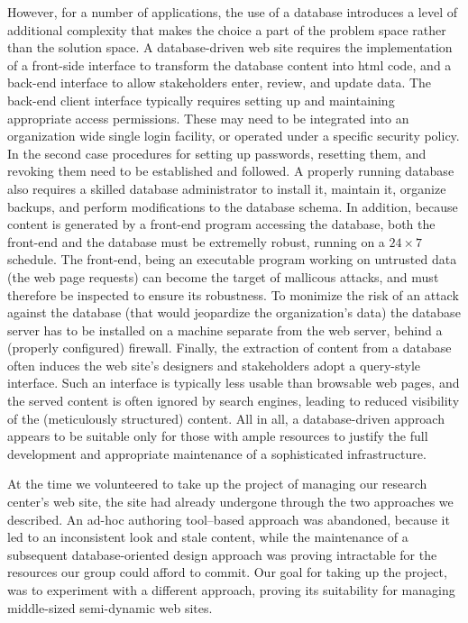 \documentclass[10pt]{article}
\begin{document}
However, for a number of applications, the use of a database
introduces a level of additional complexity that
makes the choice a part of
the problem space rather than the solution space.
A database-driven web site requires the implementation of a
front-side interface to transform the database content into
{\sc html} code, and a back-end interface to allow stakeholders
enter, review, and update data.
The back-end client interface typically requires setting up
and maintaining appropriate access permissions.
These may need to be integrated into an organization wide single
login facility, or operated under a specific security policy.
In the second case procedures for setting up passwords,
resetting them, and revoking them need to be established
and followed.
A properly running database also requires a skilled database
administrator to install it, maintain it, organize backups,
and perform modifications to the database schema.
In addition, because content is generated by a front-end
program accessing the database, both the front-end and the database
must be extremelly robust, running on a $24 \times 7$ schedule.
The front-end, being an executable program working on
untrusted data (the web page requests) can become the target of
mallicous attacks,
and must therefore be inspected to ensure its robustness.
To monimize the risk of an attack against the database
(that would jeopardize the organization's data)
the database server has to be installed on a machine separate
from the web server, behind a (properly configured) firewall.
Finally, the extraction of content from a database often
induces the web site's designers and stakeholders adopt a
query-style interface.
Such an interface is typically less usable than browsable web pages,
and the served content is often ignored by search engines,
leading to reduced visibility
of the (meticulously structured) content.
All in all, a database-driven approach appears to be suitable
only for those with ample resources to justify the full
development and appropriate maintenance of a sophisticated infrastructure.

At the time we volunteered to take up the project of managing our
research center's web site, the site had already undergone through
the two approaches we described.
An ad-hoc authoring tool--based approach was abandoned,
because it led to an inconsistent look and stale content,
while the maintenance of a subsequent database-oriented
design approach was proving intractable for the resources
our group could afford to commit.
Our goal for taking up the project, was to experiment with a
different approach,
proving its suitability for managing middle-sized semi-dynamic
web sites.
\end{document}
